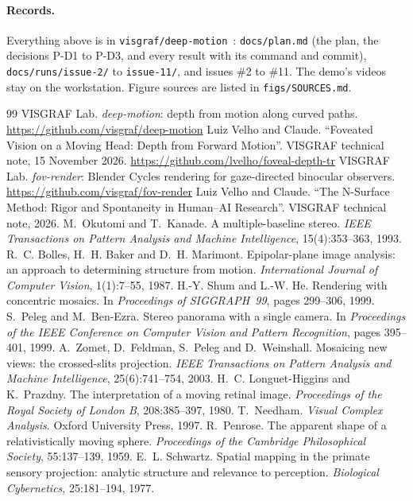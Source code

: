\documentclass[11pt,a4paper]{article}
\newcommand{\code}[1]{\texttt{\small #1}}
\begin{document}
\paragraph{Records.} Everything above is in \code{visgraf/deep-motion}~\cite{dm}: \code{docs/plan.md} (the plan, the
decisions P-D1 to P-D3, and every result with its command and commit), \code{docs/runs/issue-2/} to \code{issue-11/}, and
issues \#2 to \#11. The demo's videos stay on the workstation. Figure sources are listed in \code{figs/SOURCES.md}.

\begin{thebibliography}{99}
 VISGRAF Lab. \emph{deep-motion}: depth from motion along curved paths.
  \url{https://github.com/visgraf/deep-motion}
 Luiz Velho and Claude. ``Foveated Vision on a Moving Head: Depth from Forward Motion''. VISGRAF technical
  note, 15 November 2026. \url{https://github.com/lvelho/foveal-depth-tr}
 VISGRAF Lab. \emph{fov-render}: Blender Cycles rendering for gaze-directed binocular observers.
  \url{https://github.com/visgraf/fov-render}
 Luiz Velho and Claude. ``The N-Surface Method: Rigor and Spontaneity in Human--AI Research''.
  VISGRAF technical note, 2026.
 M.~Okutomi and T.~Kanade. A multiple-baseline stereo. \emph{IEEE Transactions on Pattern Analysis and
  Machine Intelligence}, 15(4):353--363, 1993.
 R.~C. Bolles, H.~H. Baker and D.~H. Marimont. Epipolar-plane image analysis: an approach to determining
  structure from motion. \emph{International Journal of Computer Vision}, 1(1):7--55, 1987.
 H.-Y. Shum and L.-W. He. Rendering with concentric mosaics. In \emph{Proceedings of SIGGRAPH~99}, pages
  299--306, 1999.
 S.~Peleg and M.~Ben-Ezra. Stereo panorama with a single camera. In \emph{Proceedings of the IEEE Conference
  on Computer Vision and Pattern Recognition}, pages 395--401, 1999.
 A.~Zomet, D.~Feldman, S.~Peleg and D.~Weinshall. Mosaicing new views: the crossed-slits projection.
  \emph{IEEE Transactions on Pattern Analysis and Machine Intelligence}, 25(6):741--754, 2003.
 H.~C. Longuet-Higgins and K.~Prazdny. The interpretation of a moving retinal image.
  \emph{Proceedings of the Royal Society of London B}, 208:385--397, 1980.
 T.~Needham. \emph{Visual Complex Analysis}. Oxford University Press, 1997.
 R.~Penrose. The apparent shape of a relativistically moving sphere. \emph{Proceedings of the Cambridge
  Philosophical Society}, 55:137--139, 1959.
 E.~L. Schwartz. Spatial mapping in the primate sensory projection: analytic structure and relevance
  to perception. \emph{Biological Cybernetics}, 25:181--194, 1977.
\end{thebibliography}
\end{document}
